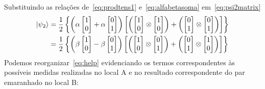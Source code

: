 Substituindo as relações de~\eqref{eq:prodtens1} e~\eqref{eq:alfabetasoma} em~\eqref{eq:psi2matrix}
\begin{equation}\label{eq:help}
  \begin{split}
\ket{\psi_2} &= \frac{1}{2}\left\{\left(\alpha\begin{bmatrix}
1 \\
0
\end{bmatrix}+\alpha\begin{bmatrix}
0 \\
1
\end{bmatrix}\right)\left[\left(\begin{bmatrix}
1 \\
0
\end{bmatrix} \otimes \begin{bmatrix}
1 \\
0
\end{bmatrix}\right) + \left(\begin{bmatrix}
0 \\
1
\end{bmatrix} \otimes \begin{bmatrix}
0 \\
1
\end{bmatrix}\right)\right]\right\} \nonumber \\
&= \frac{1}{2}\left\{\left(\beta\begin{bmatrix}
1 \\
0
\end{bmatrix}-\beta\begin{bmatrix}
0 \\
1
\end{bmatrix}\right)\left[\left(\begin{bmatrix}
1 \\
0
\end{bmatrix} \otimes \begin{bmatrix}
0 \\
1
\end{bmatrix}\right) + \left(\begin{bmatrix}
0 \\
1
\end{bmatrix} \otimes \begin{bmatrix}
1 \\
0
\end{bmatrix}\right)\right]\right\}
  \end{split}
\end{equation}
Podemos reorganizar~\eqref{eq:help} evidenciando os termos correspondentes às possíveis medidas realizadas no local A e no resultado correspondente do par emaranhado no local B:
